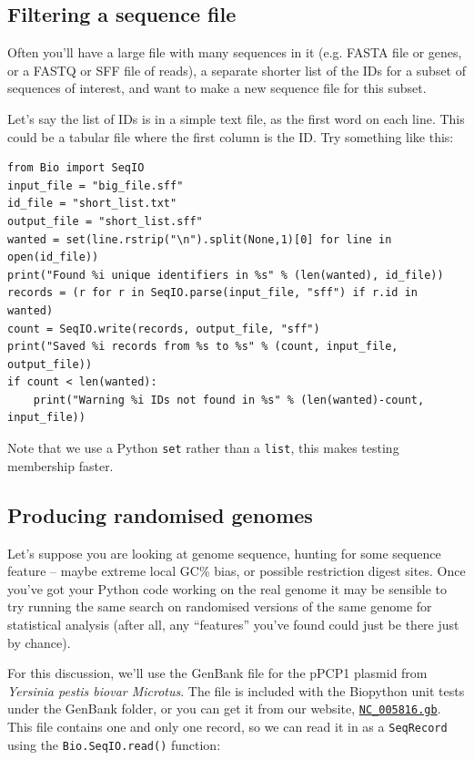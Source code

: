 \documentclass{report}
\begin{document}
\subsection{Filtering a sequence file}

Often you'll have a large file with many sequences in it (e.g. FASTA file
or genes, or a FASTQ or SFF file of reads), a separate shorter list of
the IDs for a subset of sequences of interest, and want to make a new
sequence file for this subset.

Let's say the list of IDs is in a simple text file, as the first word on
each line. This could be a tabular file where the first column is the ID.
Try something like this:

\begin{verbatim}
from Bio import SeqIO
input_file = "big_file.sff"
id_file = "short_list.txt"
output_file = "short_list.sff"
wanted = set(line.rstrip("\n").split(None,1)[0] for line in open(id_file))
print("Found %i unique identifiers in %s" % (len(wanted), id_file))
records = (r for r in SeqIO.parse(input_file, "sff") if r.id in wanted)
count = SeqIO.write(records, output_file, "sff")
print("Saved %i records from %s to %s" % (count, input_file, output_file))
if count < len(wanted):
    print("Warning %i IDs not found in %s" % (len(wanted)-count, input_file))
\end{verbatim}

Note that we use a Python \verb|set| rather than a \verb|list|, this makes
testing membership faster.

\subsection{Producing randomised genomes}

Let's suppose you are looking at genome sequence, hunting for some sequence
feature -- maybe extreme local GC\% bias, or possible restriction digest sites.
Once you've got your Python code working on the real genome it may be sensible
to try running the same search on randomised versions of the same genome for
statistical analysis (after all, any ``features'' you've found could just be
there just by chance).

For this discussion, we'll use the GenBank file for the pPCP1 plasmid from
\textit{Yersinia pestis biovar Microtus}.  The file is included with the
Biopython unit tests under the GenBank folder, or you can get it from our
website, \href{http://biopython.org/SRC/biopython/Tests/GenBank/NC_005816.gb}
{\texttt{NC\_005816.gb}}.  
This file contains one and only one record, so we can read it in as a
\verb|SeqRecord| using the \verb|Bio.SeqIO.read()| function:
\end{document}
